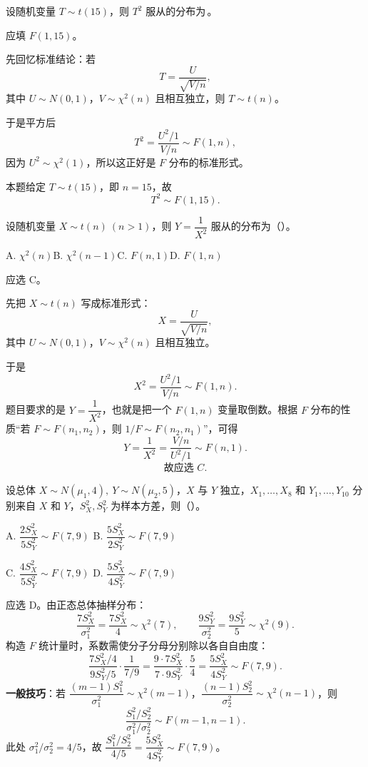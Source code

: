 ﻿\documentclass[lang=cn,11pt]{elegantbook}
\begin{document}
\begin{exercise}\label{exer:6-t2-f}
设随机变量 \(T \sim t(15)\)，则 \(T^2\) 服从的分布为\,\underline{\hspace{2cm}}。
\end{exercise}
\begin{solution}
应填 \(F(1,15)\)。

先回忆标准结论：若
\[
T = \frac{U}{\sqrt{V/n}},
\]
其中 \(U \sim N(0,1)\)，\(V \sim \chi^2(n)\) 且相互独立，则 \(T \sim t(n)\)。

于是平方后
\[
T^2 = \frac{U^2/1}{V/n} \sim F(1,n),
\]
因为 \(U^2 \sim \chi^2(1)\)，所以这正好是 \(F\) 分布的标准形式。

本题给定 \(T \sim t(15)\)，即 \(n=15\)，故
\[
T^2 \sim F(1,15).
\]
\end{solution}

\begin{exercise}\label{exer:6-inv-t2}
设随机变量 \(X \sim t(n)\ (n > 1)\)，则 \(Y = \dfrac{1}{X^2}\) 服从的分布为（\quad）。\par
A. \(\chi^2(n)\)\quad B. \(\chi^2(n-1)\)\quad C. \(F(n,1)\)\quad D. \(F(1,n)\)
\end{exercise}
\begin{solution}
应选 C。

先把 \(X\sim t(n)\) 写成标准形式：
\[
X = \frac{U}{\sqrt{V/n}},
\]
其中 \(U \sim N(0,1)\)，\(V \sim \chi^2(n)\) 且相互独立。

于是
\[
X^2 = \frac{U^2/1}{V/n} \sim F(1,n).
\]
题目要求的是 \(Y=\dfrac{1}{X^2}\)，也就是把一个 \(F(1,n)\) 变量取倒数。根据 \(F\) 分布的性质“若 \(F\sim F(n_1,n_2)\)，则 \(1/F\sim F(n_2,n_1)\)”，可得
\[
Y = \frac{1}{X^2} = \frac{V/n}{U^2/1} \sim F(n, 1).
\]
\[
\text{故应选 } C.
\]
\end{solution}

\begin{exercise} \label{ex:sampling_03}
设总体 \(X\sim N(\mu_1,4),\ Y\sim N(\mu_2,5)\)，\(X\) 与 \(Y\) 独立，\(X_1,\dots,X_8\) 和 \(Y_1,\dots,Y_{10}\) 分别来自 \(X\) 和 \(Y\)，\(S_X^2,S_Y^2\) 为样本方差，则（\quad）。\par
A. \(\dfrac{2S_X^2}{5S_Y^2}\sim F(7,9)\)\qquad
B. \(\dfrac{5S_X^2}{2S_Y^2}\sim F(7,9)\)\par
C. \(\dfrac{4S_X^2}{5S_Y^2}\sim F(7,9)\)\qquad
D. \(\dfrac{5S_X^2}{4S_Y^2}\sim F(7,9)\)
\end{exercise}

\begin{solution}
应选 D。由正态总体抽样分布：
\[
\frac{7S_X^2}{\sigma_1^2}=\frac{7S_X^2}{4}\sim\chi^2(7),\qquad \frac{9S_Y^2}{\sigma_2^2}=\frac{9S_Y^2}{5}\sim\chi^2(9).
\]
构造 \(F\) 统计量时，系数需使分子分母分别除以各自自由度：
\[
\frac{7S_X^2/4}{9S_Y^2/5}\cdot\frac{1}{7/9}=\frac{9\cdot 7S_X^2}{7\cdot 9S_Y^2}\cdot\frac{5}{4}=\frac{5S_X^2}{4S_Y^2}\sim F(7,9).
\]
\textbf{一般技巧}：若 \(\dfrac{(m-1)S_1^2}{\sigma_1^2}\sim\chi^2(m{-}1)\)，\(\dfrac{(n-1)S_2^2}{\sigma_2^2}\sim\chi^2(n{-}1)\)，则
\[
\frac{S_1^2/S_2^2}{\sigma_1^2/\sigma_2^2}\sim F(m{-}1,n{-}1).
\]
此处 \(\sigma_1^2/\sigma_2^2=4/5\)，故 \(\dfrac{S_1^2/S_2^2}{4/5}=\dfrac{5S_X^2}{4S_Y^2}\sim F(7,9)\)。
\end{solution}
\end{document}

